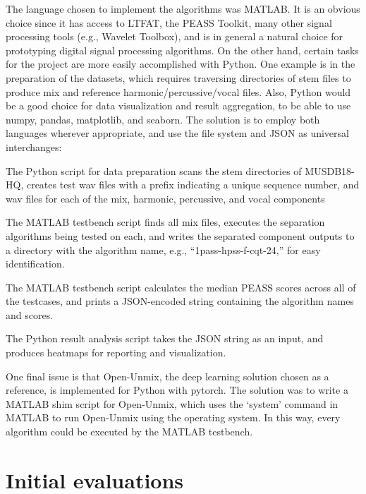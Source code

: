 \documentclass[letter,12pt]{article}
\newenvironment{tight_enumerate}{
\begin{enumerate}
  \setlength{\itemsep}{0pt}
  \setlength{\parskip}{0pt}
}{\end{enumerate}}
\begin{document}
The language chosen to implement the algorithms was MATLAB. It is an obvious choice since it has access to LTFAT, the PEASS Toolkit, many other signal processing tools (e.g., Wavelet Toolbox), and is in general a natural choice for prototyping digital signal processing algorithms. On the other hand, certain tasks for the project are more easily accomplished with Python. One example is in the preparation of the datasets, which requires traversing directories of stem files to produce mix and reference harmonic/percussive/vocal files. Also, Python would be a good choice for data visualization and result aggregation, to be able to use numpy\cite{numpy}, pandas\cite{pandas}, matplotlib\cite{matplotlib}, and seaborn\cite{seaborn}. The solution is to employ both languages wherever appropriate, and use the file system and JSON as universal interchanges:
\begin{tight_enumerate}
\item
	The Python script for data preparation scans the stem directories of MUSDB18-HQ, creates test wav files with a prefix indicating a unique sequence number, and wav files for each of the mix, harmonic, percussive, and vocal components
\item
	The MATLAB testbench script finds all mix files, executes the separation algorithms being tested on each, and writes the separated component outputs to a directory with the algorithm name, e.g., ``1pass-hpss-f-cqt-24,'' for easy identification.
\item
	The MATLAB testbench script calculates the median PEASS scores across all of the testcases, and prints a JSON-encoded string containing the algorithm names and scores.
\item
	The Python result analysis script takes the JSON string as an input, and produces heatmaps for reporting and visualization.
\end{tight_enumerate}

One final issue is that Open-Unmix, the deep learning solution chosen as a reference, is implemented for Python with pytorch\cite{pytorch}. The solution was to write a MATLAB shim script for Open-Unmix, which uses the `system' command in MATLAB to run Open-Unmix using the operating system. In this way, every algorithm could be executed by the MATLAB testbench.

\section{Initial evaluations}
\label{sec:elim}
\end{document}
